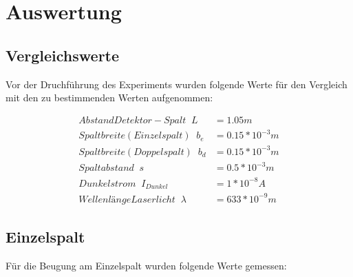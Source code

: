 \section{Auswertung}

\subsection{Vergleichswerte}

Vor der Druchführung des Experiments wurden folgende Werte für den Vergleich mit den zu bestimmenden Werten aufgenommen:

\begin{align*}
    Abstand Detektor-Spalt \; \;  L &= 1.05m \\
    Spaltbreite (Einzelspalt)\; \; b_e &= 0.15*10^{-3}m \\
    Spaltbreite (Doppelspalt)\; \; b_d &= 0.15*10^{-3}m \\
    Spaltabstand\; \; s &= 0.5*10^{-3}m \\
    Dunkelstrom\; \; I_{Dunkel} &= 1*10^{-8}A\\
    Wellenlänge Laserlicht\; \; \lambda &= 633*10^{-9}m 
\end{align*}

\subsection{Einzelspalt}

Für die Beugung am Einzelspalt wurden folgende Werte gemessen:

